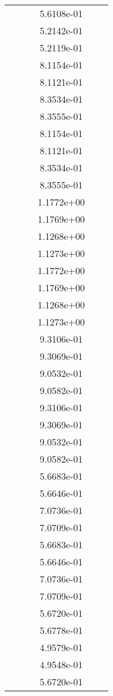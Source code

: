 \begin{xltabular}{\textwidth}{r|rS[table-format=1.3e+2]S[table-format=1.4e+2]S[table-format=1.4e+2]S[table-format=-1.5]}
&  &  & 5.6108e-01 & & \\
&  &  & 5.2142e-01 & & \\
&  &  & 5.2119e-01 & & \\
&  &  & 8.1154e-01 & & \\
&  &  & 8.1121e-01 & & \\
&  &  & 8.3534e-01 & & \\
&  &  & 8.3555e-01 & & \\
&  &  & 8.1154e-01 & & \\
&  &  & 8.1121e-01 & & \\
&  &  & 8.3534e-01 & & \\
&  &  & 8.3555e-01 & & \\
&  &  & 1.1772e+00 & & \\
&  &  & 1.1769e+00 & & \\
&  &  & 1.1268e+00 & & \\
&  &  & 1.1273e+00 & & \\
&  &  & 1.1772e+00 & & \\
&  &  & 1.1769e+00 & & \\
&  &  & 1.1268e+00 & & \\
&  &  & 1.1273e+00 & & \\
&  &  & 9.3106e-01 & & \\
&  &  & 9.3069e-01 & & \\
&  &  & 9.0532e-01 & & \\
&  &  & 9.0582e-01 & & \\
&  &  & 9.3106e-01 & & \\
&  &  & 9.3069e-01 & & \\
&  &  & 9.0532e-01 & & \\
&  &  & 9.0582e-01 & & \\
&  &  & 5.6683e-01 & & \\
&  &  & 5.6646e-01 & & \\
&  &  & 7.0736e-01 & & \\
&  &  & 7.0709e-01 & & \\
&  &  & 5.6683e-01 & & \\
&  &  & 5.6646e-01 & & \\
&  &  & 7.0736e-01 & & \\
&  &  & 7.0709e-01 & & \\
&  &  & 5.6720e-01 & & \\
&  &  & 5.6778e-01 & & \\
&  &  & 4.9579e-01 & & \\
&  &  & 4.9548e-01 & & \\
&  &  & 5.6720e-01 & & \\

\end{xltabular}
